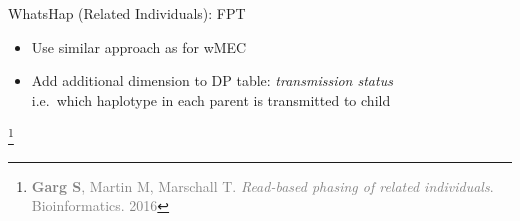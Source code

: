 \documentclass[notes=hide]{beamer}
\begin{document}

\begin{frame}

		\begin{block}{WhatsHap (Related Individuals): \color{red} FPT }
			\begin{itemize}
				\item Use similar approach as for wMEC
				\item Add additional dimension to DP table: \emph{transmission status}\\
				i.e.\ which haplotype in each parent is transmitted to child
			\end{itemize}
		\end{block}
		\let\thefootnote\relax\footnote{\scriptsize\textcolor{gray}{\textbf{Garg S}, Martin M, Marschall T. \textit{Read-based phasing of related individuals}. Bioinformatics. 2016}}
\end{frame}

\end{document}
